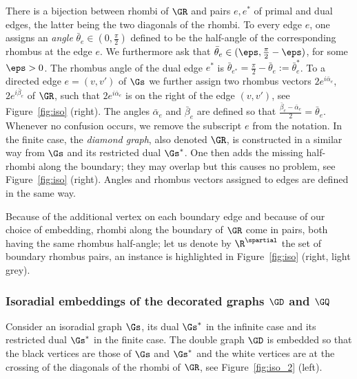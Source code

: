\documentclass[a4paper,twoside,11pt]{article}
\begin{document}
There is a bijection between rhombi of $\GR$ and pairs $e,e^*$ of primal and dual edges, the latter being the two diagonals of 
the rhombi. To every edge $e$, one assigns an \emph{angle} $\bar{\theta}_e\in(0,\frac{\pi}{2})$ 
defined to be the half-angle of the corresponding rhombus at the edge $e$. We furthermore ask that $\bar{\theta}_e\in(\eps,\frac{\pi}{2}-\eps)$,
for some $\eps>0$. The rhombus angle of the dual edge $e^*$ is 
$\bar{\theta}_{e^*}=\frac{\pi}{2}-\bar{\theta}_e:=\bar{\theta}_e^*$.
To a directed edge $e=(v,v')$ of $\Gs$ we further assign two rhombus vectors $2e^{i\bar{\alpha}_e}$, $2e^{i\bar{\beta}_e}$ of $\GR$, such that
$2e^{i\bar{\alpha}_e}$ is on the right of the edge $(v,v')$, see Figure~\ref{fig:iso} (right). The angles $\bar{\alpha}_e$ and $\bar{\beta}_e$ are 
defined so that $\frac{\bar{\beta}_e-\bar{\alpha}_e}{2}=\bar{\theta}_e$. Whenever no confusion occurs, we remove the subscript $e$ from the notation.
In the finite case, the \emph{diamond graph}, also denoted $\GR$, is constructed in a similar way from $\Gs$ and 
its restricted dual $\Gs^*$. One then adds the missing half-rhombi along the boundary; they may overlap but this causes no 
problem, see Figure~\ref{fig:iso} (right). Angles and rhombus vectors assigned to edges are defined in the same way. 

Because of the additional vertex on each boundary edge 
and because of our choice of embedding, rhombi along the boundary of 
$\GR$ come in pairs, both having the same rhombus half-angle; let us denote by $\R^\spartial$ the set of boundary rhombus pairs,  
an instance is highlighted in Figure~\ref{fig:iso} (right, light grey).






\subsubsection{Isoradial embeddings of the decorated graphs $\GD$ and $\GQ$}\label{sec:iso_GDGQ}

Consider an isoradial graph $\Gs$, its dual $\Gs^*$ in the infinite case and its restricted dual $\Gs^*$ in the finite case.
The double graph $\GD$ is embedded so that the black vertices are those of $\Gs$ and $\Gs^*$ and the white 
vertices are at the crossing of the diagonals of the rhombi of $\GR$, see Figure~\ref{fig:iso_2} (left).
\end{document}
